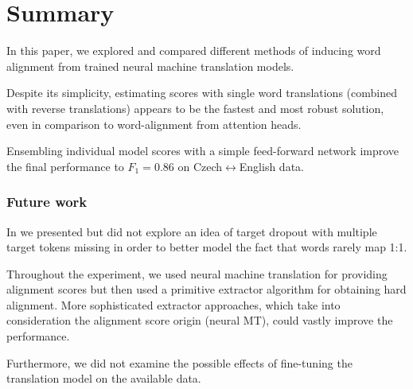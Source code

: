\section{Summary}

In this paper, we explored and compared different methods of inducing word alignment from trained neural machine translation models.

Despite its simplicity, estimating scores with single word translations (combined with reverse translations) appears to be the fastest and most robust solution, even in comparison to word-alignment from attention heads.

Ensembling individual model scores with a simple feed-forward network improve the final performance to $F_1 = 0.86$ on Czech$\leftrightarrow$English data.

\subsubsection*{Future work}

In  we presented but did not explore an idea of target dropout with multiple target tokens missing in order to better model the fact that words rarely map 1:1.

Throughout the experiment, we used neural machine translation for providing alignment scores but then used a primitive extractor algorithm for obtaining hard alignment. More sophisticated extractor approaches, which take into consideration the alignment score origin (neural MT), could vastly improve the performance.

Furthermore, we did not examine the possible effects of fine-tuning the translation model on the available data.